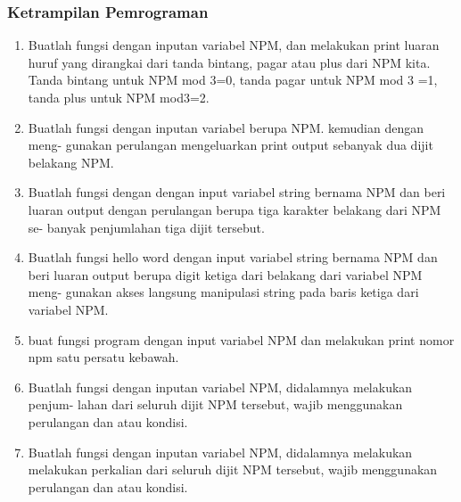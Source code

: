 \subsubsection{Ketrampilan Pemrograman}
\begin{enumerate}
    \item Buatlah fungsi dengan inputan variabel NPM, dan melakukan print luaran huruf
    yang dirangkai dari tanda bintang, pagar atau plus dari NPM kita. Tanda
    bintang untuk NPM mod 3=0, tanda pagar untuk NPM mod 3 =1, tanda plus
    untuk NPM mod3=2.
    

    \item Buatlah fungsi dengan inputan variabel berupa NPM. kemudian dengan meng-
    gunakan perulangan mengeluarkan print output sebanyak dua dijit belakang
    NPM.
    

    \item Buatlah fungsi dengan dengan input variabel string bernama NPM dan beri
    luaran output dengan perulangan berupa tiga karakter belakang dari NPM se-
    banyak penjumlahan tiga dijit tersebut.
    

    \item Buatlah fungsi hello word dengan input variabel string bernama NPM dan
    beri luaran output berupa digit ketiga dari belakang dari variabel NPM meng-
    gunakan akses langsung manipulasi string pada baris ketiga dari variabel NPM.
    

    \item buat fungsi program dengan input variabel NPM dan melakukan print nomor npm satu persatu kebawah.
    

    \item Buatlah fungsi dengan inputan variabel NPM, didalamnya melakukan penjum-
    lahan dari seluruh dijit NPM tersebut, wajib menggunakan perulangan dan
    atau kondisi.
    

    \item Buatlah fungsi dengan inputan variabel NPM, didalamnya melakukan melakukan
    perkalian dari seluruh dijit NPM tersebut, wajib menggunakan perulangan dan
    atau kondisi.
    


\end{enumerate}
